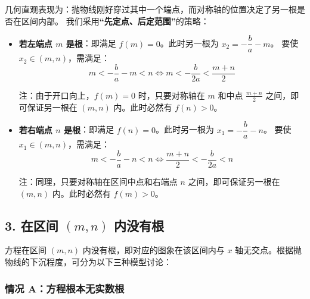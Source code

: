\documentclass[11pt,a4paper]{ctexart}
\begin{document}
几何直观表现为：抛物线刚好穿过其中一个端点，而对称轴的位置决定了另一根是否在区间内部。
我们采用\textbf{“先定点、后定范围”}的策略：
\begin{itemize}
  \item \textbf{若左端点 $m$ 是根}：即满足 $f(m)=0$。此时另一根为 $x_2 = -\dfrac{b}{a} - m$。
        要使 $x_2 \in (m, n)$，需满足：
        \[
        m < -\dfrac{b}{a} - m < n \Longleftrightarrow m < -\dfrac{b}{2a} < \dfrac{m+n}{2}
        \]
        \begin{graynote}
        注：由于开口向上，$f(m)=0$ 时，只要对称轴在 $m$ 和中点 $\frac{m+n}{2}$ 之间，即可保证另一根在 $(m,n)$ 内。此时必然有 $f(n)>0$。
        \end{graynote}
  \item \textbf{若右端点 $n$ 是根}：即满足 $f(n)=0$。此时另一根为 $x_1 = -\dfrac{b}{a} - n$。
        要使 $x_1 \in (m, n)$，需满足：
        \[
        m < -\dfrac{b}{a} - n < n \Longleftrightarrow \dfrac{m+n}{2} < -\dfrac{b}{2a} < n
        \]
        \begin{graynote}
        注：同理，只要对称轴在区间中点和右端点 $n$ 之间，即可保证另一根在 $(m,n)$ 内。此时必然有 $f(m)>0$。
        \end{graynote}
\end{itemize}

\subsection{3. 在区间 $(m, n)$ 内没有根}
方程在区间 $(m, n)$ 内没有根，即对应的图象在该区间内与 $x$ 轴无交点。根据抛物线的下沉程度，可分为以下三种模型讨论：

\subsubsection{情况 A：方程根本无实数根}
\par{}\addvspace{0.3em}
\end{document}
